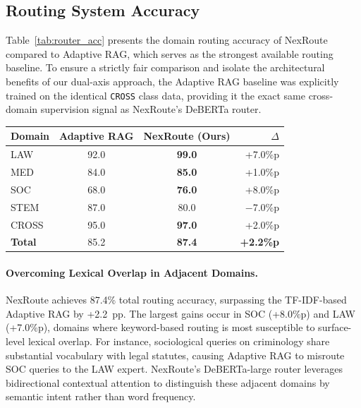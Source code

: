 \documentclass[a4paper,fleql]{cas-sc}
\begin{document}
\subsection{Routing System Accuracy}
\label{ssec:router}
Table~\ref{tab:router_acc} presents the domain routing accuracy of NexRoute
compared to Adaptive RAG, which serves as the strongest available routing
baseline. To ensure a strictly fair comparison and isolate the architectural
benefits of our dual-axis approach, the Adaptive RAG baseline was explicitly
trained on the identical \texttt{CROSS} class data, providing it the exact
same cross-domain supervision signal as NexRoute's DeBERTa router.

\vspace{6pt}
\begin{center}
\begingroup
{}
\label{tab:router_acc}
\begin{tabular}{lccr}
\toprule
\textbf{Domain} & \textbf{Adaptive RAG} & \textbf{NexRoute (Ours)} & \textbf{$\Delta$} \\
\midrule
LAW              & 92.0 & \textbf{99.0} & +7.0\%p \\
MED              & 84.0 & \textbf{85.0}  & +1.0\%p \\
SOC              & 68.0 & \textbf{76.0}  & +8.0\%p \\
STEM             & 87.0 & 80.0           & $-$7.0\%p \\
\midrule
CROSS            & 95.0 & \textbf{97.0}  & +2.0\%p \\
\midrule
\textbf{Total}   & 85.2 & \textbf{87.4}  & \textbf{+2.2\%p} \\
\bottomrule
\end{tabular}
\endgroup
\end{center}
\vspace{6pt}

\paragraph{Overcoming Lexical Overlap in Adjacent Domains.}
NexRoute achieves 87.4\% total routing accuracy, surpassing the TF-IDF-based
Adaptive RAG by +2.2~pp. The largest gains occur in SOC (+8.0\%p) and LAW
(+7.0\%p), domains where keyword-based routing is most susceptible to
surface-level lexical overlap. For instance, sociological queries on
criminology share substantial vocabulary with legal statutes, causing Adaptive
RAG to misroute SOC queries to the LAW expert. NexRoute's DeBERTa-large
router leverages bidirectional contextual attention to distinguish these
adjacent domains by semantic intent rather than word frequency.
\end{document}
